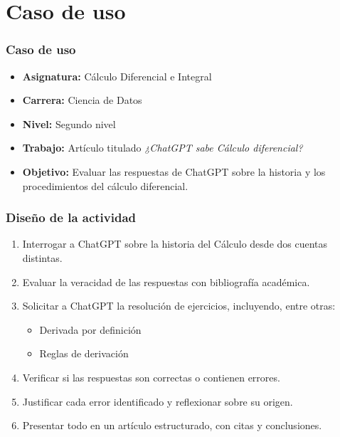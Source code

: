 \section{Caso de uso}

\begin{frame}
    \frametitle{Caso de uso}

    \begin{itemize}
        \item \textbf{Asignatura:} Cálculo Diferencial e Integral
        \item \textbf{Carrera:} Ciencia de Datos
        \item \textbf{Nivel:} Segundo nivel
        \item \textbf{Trabajo:} Artículo titulado \textit{¿ChatGPT sabe Cálculo diferencial?}
        \item \textbf{Objetivo:} Evaluar las respuestas de ChatGPT sobre la historia y los procedimientos del cálculo diferencial.
    \end{itemize}
\end{frame}


\begin{frame}
    \frametitle{Diseño de la actividad}

    \small
    \begin{enumerate}[leftmargin=*, label=\arabic*.]
        \item Interrogar a ChatGPT sobre la historia del Cálculo desde dos cuentas distintas.
        \item Evaluar la veracidad de las respuestas con bibliografía académica.
        \item Solicitar a ChatGPT la resolución de ejercicios, incluyendo, entre otras:
        \begin{itemize}
            \item Derivada por definición
            \item Reglas de derivación
        \end{itemize}
        \item Verificar si las respuestas son correctas o contienen errores.
        \item Justificar cada error identificado y reflexionar sobre su origen.
        \item Presentar todo en un artículo estructurado, con citas y conclusiones.
    \end{enumerate}
\end{frame}

